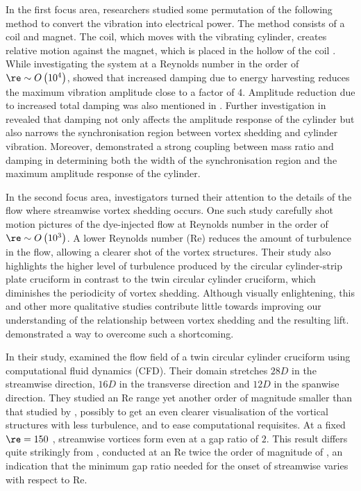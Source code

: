 \documentclass[a4paper,fleqn]{cas-sc}
\begin{document}
In the first focus area, researchers studied some permutation of the following method to convert the vibration into electrical power. The method consists of a coil and magnet. The coil, which moves with the vibrating cylinder, creates relative motion against the magnet, which is placed in the hollow of the coil \citep{Koide2009}. While investigating the system at a Reynolds number in the order of $\re \sim O \left( 10^{4} \right)$, \citet{Koide2009} showed that increased damping due to energy harvesting reduces the maximum vibration amplitude close to a factor of 4. Amplitude reduction due to increased total damping was also mentioned in \citet{Bernitsas2008a,Bernitsas2008b,Bernitsas2009}. Further investigation in \citet{Nguyen2012} revealed that damping not only affects the amplitude response of the cylinder but also narrows the synchronisation region between vortex shedding and cylinder vibration. Moreover, \citet{Nguyen2012} demonstrated a strong coupling between mass ratio and damping in determining both the width of the synchronisation region and the maximum amplitude response of the cylinder.

In the second focus area, investigators turned their attention to the details of the flow where streamwise vortex shedding occurs. One such study carefully shot motion pictures of the dye-injected flow \citep{Koide2017} at Reynolds number in the order of $\re \sim O\left( 10^{3} \right)$. A lower Reynolds number (Re) reduces the amount of turbulence in the flow, allowing a clearer shot of the vortex structures. Their study also highlights the higher level of turbulence produced by the circular cylinder-strip plate cruciform in contrast to the twin circular cylinder cruciform, which diminishes the periodicity of vortex shedding. Although visually enlightening, this and other more qualitative studies contribute little towards improving our understanding of the relationship between vortex shedding and the resulting lift. \citet{Deng2007} demonstrated a way to overcome such a shortcoming.

In their study, \citet{Deng2007} examined the flow field of a twin circular cylinder cruciform using computational fluid dynamics (CFD). Their domain stretches  $28D$  in the streamwise direction,  $16D$  in the transverse direction and  $12D$  in the spanwise direction. They studied an Re range yet another order of magnitude smaller than that studied by \citet{Koide2017}, possibly to get an even clearer visualisation of the vortical structures with less turbulence, and to ease computational requisites. At a fixed  $\re = 150$ , streamwise vortices form even at a gap ratio of $2$. This result differs quite strikingly from \citet{Koide2006,Koide2007}, conducted at an Re twice the order of magnitude of \citet{Deng2007}, an indication that the minimum gap ratio needed for the onset of streamwise varies with respect to Re.
\end{document}

